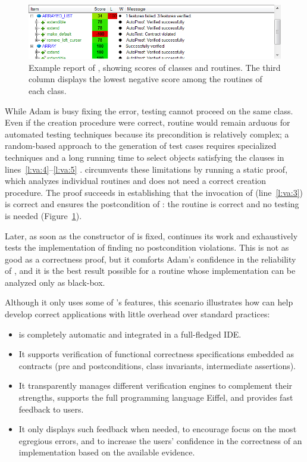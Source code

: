 \begin{figure}[!htb]
\centering
\includegraphics[width=\columnwidth]{images/va_screenshot.png}
\caption{Example report of \EVE, showing scores of classes and routines. The third column displays the lowest negative score among the routines of each class.}
\label{fig:motivating-screenshot}
\end{figure}

While Adam is busy fixing the error, testing cannot proceed on the same class. Even if the creation procedure were correct, routine  would remain arduous for automated testing techniques because its precondition is relatively complex; a random-based approach to the generation of test cases requires specialized techniques and a long running time to select objects satisfying the clauses in lines~\ref{l:va:4}--\ref{l:va:5} \cite{WEI10}.
\EVE circumvents these limitations by running a static proof, which analyzes individual routines and does not need a correct creation procedure. The proof succeeds in establishing that the invocation of  (line~\ref{l:va:3}) is correct and ensures the postcondition of : the routine is correct and no testing is needed (Figure~\ref{fig:motivating-screenshot}).


Later, as soon as the constructor of  is fixed, \EVE continues its work and exhaustively tests the implementation of  finding no postcondition violations. This is not as good as a correctness proof, but it comforts Adam's confidence in the reliability of , and it is the best result possible for a routine whose implementation can be analyzed only as black-box.

Although it only uses some of \EVE's features, this scenario illustrates how \EVE can help develop correct applications with little overhead over standard practices:
\begin{itemize}

\item
\EVE is completely automatic and integrated in a full-fledged IDE.

\item
It supports verification of functional correctness specifications embedded as contracts (pre and postconditions, class invariants, intermediate assertions).

\item
It transparently manages different verification engines to complement their strengths, supports the full programming language Eiffel, and provides fast feedback to users.

\item
It only displays such feedback when needed, to encourage focus on the most egregious errors, and to increase the users' confidence in the correctness of an implementation based on the available evidence.
\end{itemize}